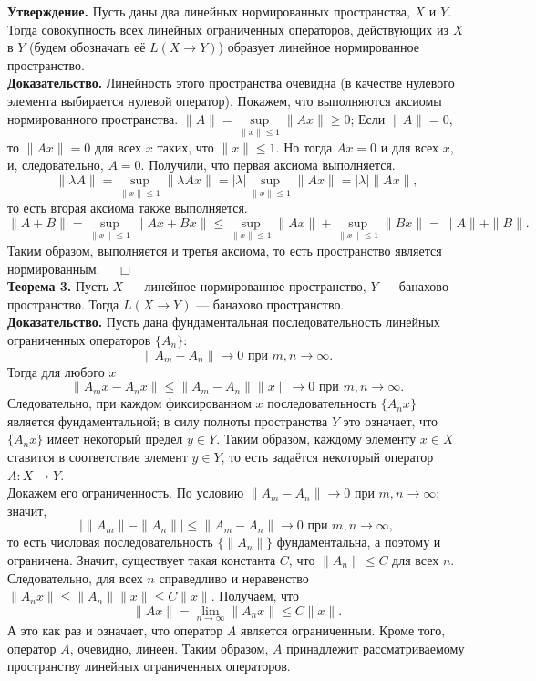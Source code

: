 \documentclass[12pt,a4paper, titlepage]{article}
\begin{document}
\textbf{Утверждение.} Пусть даны два линейных нормированных пространства, $X$ и $Y$. Тогда совокупность всех линейных ограниченных операторов, действующих из $X$ в $Y$ (будем обозначать её $L(X \to Y)$) образует линейное нормированное пространство.\\
\textbf{Доказательство.} Линейность этого пространства очевидна (в качестве нулевого элемента выбирается нулевой оператор). Покажем, что выполняются аксиомы нормированного пространства. $\|A\| = \sup\limits_{\|x\| \leqslant 1} \|A x\| \geqslant 0$; Если $\|A\| = 0$, то $\|A x\| = 0$ для всех $x$ таких, что $\|x\| \leqslant 1$. Но тогда $A x = 0$ и для всех $x$, и, следовательно, $A = 0$. Получили, что первая аксиома выполняется.
$$
\|\lambda A\| = \sup_{\|x\| \leqslant 1} \|\lambda A x\| = |\lambda | \sup_{\|x\| \leqslant 1} \|Ax\| = |\lambda | \|Ax\|,
$$
то есть вторая аксиома также выполняется.
$$
\|A + B\| =  \sup_{\|x\| \leqslant 1} \|Ax + Bx\| \leqslant \sup_{\|x\| \leqslant 1} \|Ax\| + \sup_{\|x\| \leqslant 1} \|Bx\| = \|A\| + \|B\|.
$$
Таким образом, выполняется и третья аксиома, то есть пространство является нормированным. $\quad \Box$\\

\textbf{Теорема 3.} Пусть $X$ --- линейное нормированное пространство, $Y$ --- банахово пространство. Тогда $L(X \to Y)$ --- банахово пространство.\\
\textbf{Доказательство.} Пусть дана фундаментальная последовательность линейных ограниченных операторов $\lbrace A_n \rbrace$:
$$
\|A_m - A_n\| \to 0 \text{ при } m,n \to \infty.
$$
Тогда для любого $x$
$$
\|A_m x - A_n x\| \leqslant \|A_m - A_n\| \|x\| \to 0 \text{ при } m,n \to \infty.
$$
Следовательно, при каждом фиксированном $x$ последовательность $\lbrace A_n x \rbrace$ является фундаментальной; в силу полноты пространства $Y$ это означает, что $\lbrace A_n x \rbrace$ имеет некоторый предел $y \in Y$. Таким образом, каждому элементу $x \in X$ ставится в соответствие элемент $y \in Y$, то есть задаётся некоторый оператор $A: X \to Y$.\\

Докажем его ограниченность. По условию $\|A_m - A_n\| \to 0 \text{ при } m,n \to \infty$; значит,
$$
\left| \|A_m\| - \|A_n\| \right| \leqslant \|A_m - A_n\| \to 0 \text{ при } m,n \to \infty,
$$
то есть числовая последовательность $\lbrace \|A_n\| \rbrace$ фундаментальна, а поэтому и ограничена. Значит, существует такая константа $C$, что $\|A_n\| \leqslant C$ для всех $n$. Следовательно, для всех $n$ справедливо и неравенство $\|A_n x\| \leqslant \|A_n\| \|x\| \leqslant C \|x\|$. Получаем, что
$$
\|Ax\| = \lim_{n\to\infty} \|A_n x\| \leqslant C \|x\|.
$$
А это как раз и означает, что оператор $A$ является ограниченным. Кроме того, оператор $A$, очевидно, линеен. Таким образом, $A$ принадлежит рассматриваемому пространству линейных ограниченных операторов.\\
\end{document}
